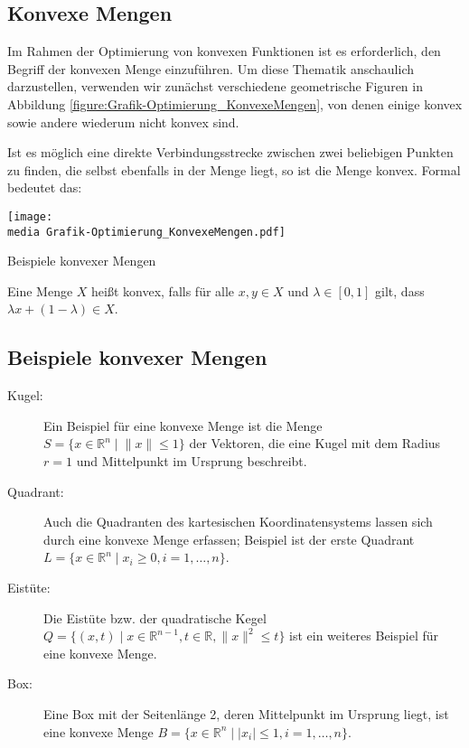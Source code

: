 \subsection{Konvexe Mengen}
Im Rahmen der Optimierung von konvexen Funktionen ist es erforderlich, den Begriff der konvexen Menge einzuführen. Um diese Thematik anschaulich darzustellen, verwenden wir zunächst verschiedene geometrische Figuren in Abbildung \ref{figure:Grafik-Optimierung_KonvexeMengen}, von denen einige konvex sowie andere wiederum nicht konvex sind.

Ist es möglich eine direkte Verbindungsstrecke zwischen zwei beliebigen Punkten zu finden, die selbst ebenfalls in der Menge liegt, so ist die Menge konvex. Formal bedeutet das:

\begin{dsafigure}
\begin{center}
\texttt{[image: \\media Grafik-Optimierung\_KonvexeMengen.pdf]}
\label{figure:Grafik-Optimierung_KonvexeMengen}
\caption{Beispiele konvexer Mengen}
\end{center}
\end{dsafigure}

\begin{Def}
Eine Menge $X$ heißt konvex, falls für alle $x, y \in X$ und $\lambda \in [0,1]$ gilt, dass $\lambda x + (1 - \lambda) \in X$.
\end{Def}

\subsection{Beispiele konvexer Mengen}
\begin{description}
\item[Kugel:]
Ein Beispiel für eine konvexe Menge ist die Menge $S = \{x \in \mathbb{R}^{n} \mid \lVert x \rVert \le 1\}$ der Vektoren, die eine Kugel mit dem Radius $r = 1$ und Mittelpunkt im Ursprung beschreibt.
\item[Quadrant:] Auch die Quadranten des kartesischen Koordinatensystems lassen sich durch eine konvexe Menge erfassen; Beispiel ist der erste Quadrant $L = \{ x \in \mathbb{R}^{n} \mid x_i \ge 0, i=1,\dots,n\}$.
\item[Eistüte:] Die Eistüte bzw. der quadratische Kegel $Q = \{(x, t) \mid x\in \mathbb{R}^{n-1}, t\in \mathbb{R}, \lVert x\rVert ^{2} \le t\}$ ist ein weiteres Beispiel für eine konvexe Menge.
\item[Box:] Eine Box mit der Seitenlänge 2, deren Mittelpunkt im Ursprung liegt, ist eine konvexe Menge $B = \{x \in \mathbb{R}^{n} \mid |x_{i}| \le 1, i = 1, \dots, n\}$.
\end{description}

